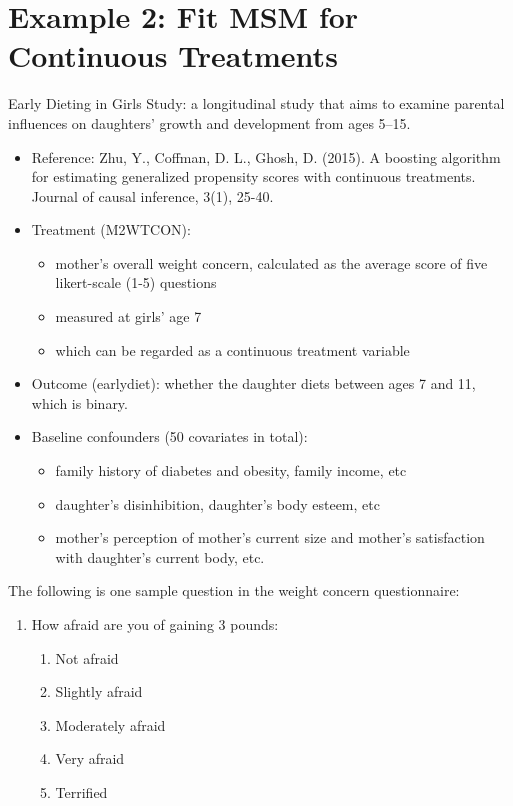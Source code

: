 \documentclass[oneside]{book}\usepackage[]{graphicx}\usepackage[svgnames]{xcolor}
\begin{document}
\section{Example 2: Fit MSM for Continuous Treatments}
Early Dieting in Girls Study: a longitudinal study that aims to examine
parental influences on daughters' growth and development from ages 5--15.
\begin{itemize}
      \item Reference: Zhu, Y., Coffman, D. L., Ghosh, D. (2015). A boosting algorithm for estimating generalized propensity
            scores with continuous treatments. Journal of causal inference, 3(1), 25-40.
\end{itemize}
\begin{itemize}
      \item Treatment (M2WTCON):
            \begin{itemize}
                  \item mother's overall weight concern, calculated as the average
                        score of five likert-scale (1-5) questions
                  \item measured at girls' age 7
                  \item which can be regarded as a continuous treatment variable
            \end{itemize}
      \item Outcome (earlydiet): whether the daughter diets between
            ages 7 and 11, which is binary.
      \item Baseline confounders (50 covariates in total):
            \begin{itemize}
                  \item family history of diabetes and obesity, family income, etc
                  \item daughter's disinhibition, daughter's body esteem, etc
                  \item mother's perception of mother's current size and mother's
                        satisfaction with daughter's current body, etc.
            \end{itemize}
\end{itemize}
The following is one sample question in the weight concern
questionnaire:
\begin{enumerate}
      \item How afraid are you of gaining 3 pounds:
            \begin{enumerate}[(1)]
                  \item Not afraid
                  \item Slightly afraid
                  \item Moderately afraid
                  \item Very afraid
                  \item Terrified
            \end{enumerate}
\end{enumerate}
\end{document}
